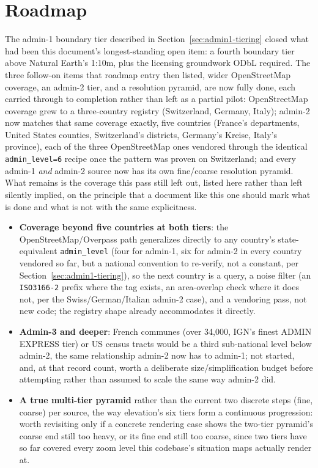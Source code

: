 \documentclass[11pt]{article}
\begin{document}
\section{Roadmap}
\label{sec:roadmap}

The admin-1 boundary tier described in
Section~\ref{sec:admin1-tiering} closed what had been this document's
longest-standing open item: a fourth boundary tier above Natural
Earth's 1:10m, plus the licensing groundwork ODbL required. The three
follow-on items that roadmap entry then listed, wider OpenStreetMap
coverage, an admin-2 tier, and a resolution pyramid, are now fully
done, each carried through to completion rather than left as a partial
pilot: OpenStreetMap coverage grew to a three-country registry
(Switzerland, Germany, Italy); admin-2 now matches that same coverage
exactly, five countries (France's departments, United States counties,
Switzerland's districts, Germany's Kreise, Italy's province), each of
the three OpenStreetMap ones vendored through the identical
\texttt{admin\_level=6} recipe once the pattern was proven on
Switzerland; and every admin-1 \emph{and} admin-2 source now has its
own fine/coarse resolution pyramid. What remains is the coverage this
pass still left out, listed here rather than left silently implied, on
the principle that a document like this one should mark what is done
and what is not with the same explicitness.

\begin{itemize}[leftmargin=1.4em]
\item \textbf{Coverage beyond five countries at both tiers}: the
  OpenStreetMap/Overpass path generalizes directly to any country's
  state-equivalent \texttt{admin\_level} (four for admin-1, six for
  admin-2 in every country vendored so far, but a national convention
  to re-verify, not a constant, per Section~\ref{sec:admin1-tiering}),
  so the next country is a query, a noise filter (an
  \texttt{ISO3166-2} prefix where the tag exists, an area-overlap
  check where it does not, per the Swiss/German/Italian admin-2 case),
  and a vendoring pass, not new code; the registry shape already
  accommodates it directly.
\item \textbf{Admin-3 and deeper}: French communes (over 34{,}000,
  IGN's finest ADMIN EXPRESS tier) or US census tracts would be a
  third sub-national level below admin-2, the same relationship
  admin-2 now has to admin-1; not started, and, at that record count,
  worth a deliberate size/simplification budget before attempting
  rather than assumed to scale the same way admin-2 did.
\item \textbf{A true multi-tier pyramid} rather than the current two
  discrete steps (fine, coarse) per source, the way elevation's six
  tiers form a continuous progression: worth revisiting only if a
  concrete rendering case shows the two-tier pyramid's coarse end
  still too heavy, or its fine end still too coarse, since two tiers
  have so far covered every zoom level this codebase's situation maps
  actually render at.
\end{itemize}

\clearpage
\printbibliography
\end{document}
